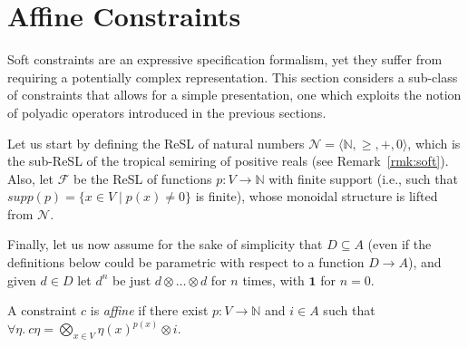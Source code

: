 \documentclass{llncs}
\newcommand{\comment}[1]{}
\def\1{{\mathbf 1}}
\def\monop{\otimes}
\begin{document}
%


\comment{
Note also that the diagonal elements are not guaranteed to be $\monop$-compact,
even if they have finite support, since $\top$ is not necessarily so.
%
To this end, we close the section by adding the simple result below to the soft constraint lore.

\begin{proposition}
	Let $c \in \mathbb{C}$ be a constraint. It is $\monop$-compact if and only if it has finite support and 
	$c\eta$ is $\monop$-compact for all $\eta$.
\end{proposition}
}

\section{Affine Constraints}\label{sec:polynomialsoftconstraints}
Soft constraints are an expressive specification formalism, yet they 
suffer from requiring a potentially complex representation.
%
This section considers a sub-class of constraints that allows 
for a simple presentation, one which exploits the notion of
polyadic operators introduced in the previous sections.

Let us start by defining the ReSL of natural numbers 
$\mathcal{N} = \langle \mathbb{N}, \geq, +, 0 \rangle$,
which is the sub-ReSL of the tropical semiring
of positive reals (see Remark~\ref{rmk:soft}).
%
Also, let $\mathcal{F}$
be the ReSL of functions $p: V \rightarrow \mathbb{N}$
with finite support (i.e., such that 
$supp(p) = \{ x \in V \mid  p(x) \neq 0\}$ is finite),
whose monoidal structure is lifted from $\mathcal{N}$.


Finally, let us now assume for the sake of simplicity that $D \subseteq A$ 
(even if the definitions below could be parametric with respect to
a function $D \rightarrow A$), and given $d \in D$ let
$d^n$ be just $d \otimes \ldots \otimes d$ for $n$ times,
with $\1$ for $n = 0$.

\begin{definition}\label{def:softconstraints}
	A constraint $c$ is \emph{affine} if there exist $p: V \rightarrow \mathbb{N}$ and $i \in A$ 
	such that $\forall\eta.\ c\eta = \bigotimes_{x \in  V} \eta(x)^{p(x)} \otimes i$.
\end{definition}
\end{document}
